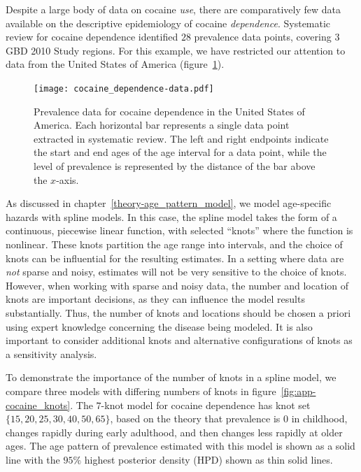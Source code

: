 Despite a large body of data on cocaine \emph{use}, there are comparatively few
data available on the descriptive epidemiology of cocaine
\emph{dependence}.\cite{degenhardt_what_2011} Systematic review for cocaine
dependence identified $28$ prevalence data points,
covering $3$ GBD 2010 Study regions.  For this example, we have restricted our attention
to data from the United States of America (figure~\ref{fig:app-cocaine_data}).

    \begin{figure}[h]
        \begin{center}
            \texttt{[image: cocaine\_dependence-data.pdf]}
            \caption[Systematic review data for cocaine dependence.]{Prevalence 
              data for cocaine dependence in the
              United States of America. Each horizontal bar represents
              a single data point extracted in systematic review.  The
              left and right endpoints indicate the start and end ages
              of the age interval for a data point, while the level of
              prevalence is represented by the distance of the bar
              above the $x$-axis.}
            \label{fig:app-cocaine_data}
        \end{center}
    \end{figure}

As discussed in chapter~\ref{theory-age_pattern_model}, we model
age-specific hazards with spline models.  In this
case, the spline model takes the form of a continuous, piecewise
linear function, with selected ``knots'' where the function is nonlinear.
These knots partition the age range
into intervals, and the choice of knots can be influential for the
resulting estimates.  In a setting where data are \emph{not} sparse and
noisy, estimates will not be very sensitive to the choice of knots.
However, when working with sparse and noisy data, the number and
location of knots are important decisions, as they can influence the
model results substantially.  Thus, the number of knots and locations
should be chosen a priori using expert knowledge concerning the
disease being modeled.  It is also
important to consider additional knots and alternative configurations
of knots as a sensitivity analysis.

To demonstrate the importance of the number of knots in a spline
model, we compare three models with differing numbers of knots in
figure~\ref{fig:app-cocaine_knots}.  The $7$-knot model for cocaine
dependence has knot set $\{15, 20, 25, 30, 40, 50, 65\}$, based on the theory that prevalence is $0$ in childhood,
changes rapidly during early adulthood, and then changes less rapidly
at older ages.  The age pattern of prevalence estimated with this
model is shown as a solid line with the $95\%$ highest posterior
density (HPD) shown as thin solid lines.

